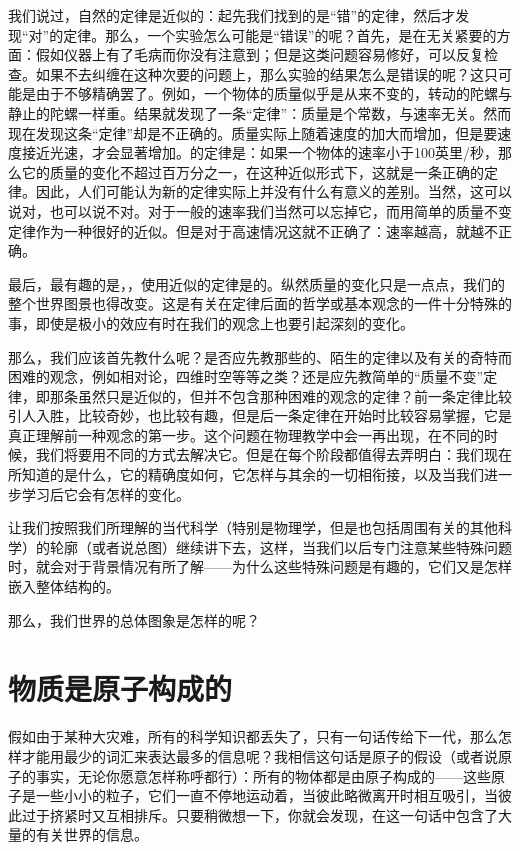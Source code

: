 我们说过，自然的定律是近似的：起先我们找到的是“错”的定律，然后才发现“对”的定律。那么，一个实验怎么可能是“错误”的呢？首先，是在无关紧要的方面：假如仪器上有了毛病而你没有注意到；但是这类问题容易修好，可以反复检查。如果不去纠缠在这种次要的问题上，那么实验的结果怎么是错误的呢？这只可能是由于不够精确罢了。例如，一个物体的质量似乎是从来不变的，转动的陀螺与静止的陀螺一样重。结果就发现了一条“定律”：质量是个常数，与速率无关。然而现在发现这条“定律”却是不正确的。质量实际上随着速度的加大而增加，但是要速度接近光速，才会显著增加。的定律是：如果一个物体的速率小于100英里/秒，那么它的质量的变化不超过百万分之一，在这种近似形式下，这就是一条正确的定律。因此，人们可能认为新的定律实际上并没有什么有意义的差别。当然，这可以说对，也可以说不对。对于一般的速率我们当然可以忘掉它，而用简单的质量不变定律作为一种很好的近似。但是对于高速情况这就不正确了：速率越高，就越不正确。

最后，最有趣的是，，使用近似的定律是的。纵然质量的变化只是一点点，我们的整个世界图景也得改变。这是有关在定律后面的哲学或基本观念的一件十分特殊的事，即使是极小的效应有时在我们的观念上也要引起深刻的变化。

那么，我们应该首先教什么呢？是否应先教那些的、陌生的定律以及有关的奇特而困难的观念，例如相对论，四维时空等等之类？还是应先教简单的“质量不变”定律，即那条虽然只是近似的，但并不包含那种困难的观念的定律？前一条定律比较引人入胜，比较奇妙，也比较有趣，但是后一条定律在开始时比较容易掌握，它是真正理解前一种观念的第一步。这个问题在物理教学中会一再出现，在不同的时候，我们将要用不同的方式去解决它。但是在每个阶段都值得去弄明白：我们现在所知道的是什么，它的精确度如何，它怎样与其余的一切相衔接，以及当我们进一步学习后它会有怎样的变化。

让我们按照我们所理解的当代科学（特别是物理学，但是也包括周围有关的其他科学）的轮廓（或者说总图）继续讲下去，这样，当我们以后专门注意某些特殊问题时，就会对于背景情况有所了解——为什么这些特殊问题是有趣的，它们又是怎样嵌入整体结构的。

那么，我们世界的总体图象是怎样的呢？

\section{物质是原子构成的}

假如由于某种大灾难，所有的科学知识都丢失了，只有一句话传给下一代，那么怎样才能用最少的词汇来表达最多的信息呢？我相信这句话是原子的假设（或者说原子的事实，无论你愿意怎样称呼都行）：所有的物体都是由原子构成的——这些原子是一些小小的粒子，它们一直不停地运动着，当彼此略微离开时相互吸引，当彼此过于挤紧时又互相排斥。只要稍微想一下，你就会发现，在这一句话中包含了大量的有关世界的信息。

